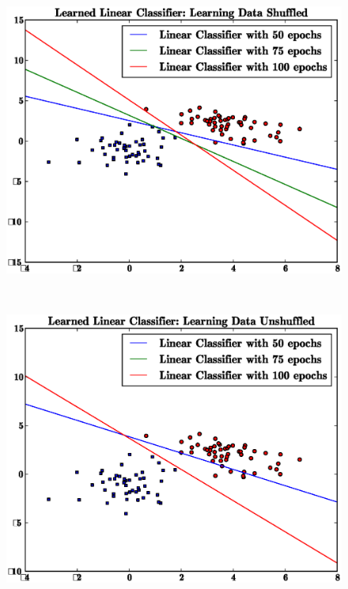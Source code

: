 \documentclass[letterpaper,10pt,titlepage]{article}
\begin{document}
\begin{figure}[th!]
\centering
\includegraphics[width=5in]{shuffled.eps} 
\end{figure} 
\\[5mm] 
\begin{figure}[th!]
\centering
\includegraphics[width=5in]{unshuffled.eps} 
\end{figure} 
\\[5mm]
\pagebreak
\end{document}
